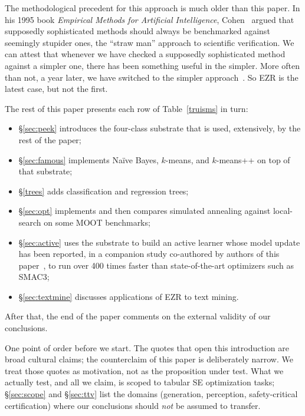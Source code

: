 \documentclass[AMA,STIX2COL]{WileyNJDv5}
\newcommand{\NEW}[1]{\textcolor{newblue}{#1}}
\begin{document}
The methodological precedent for this approach is much older than this paper.
In his 1995 book {\em
Empirical Methods for Artificial Intelligence},
Cohen~\cite{cohen1995empirical} argued that supposedly
sophisticated methods should always be benchmarked against
seemingly stupider ones, the ``straw man'' approach to
scientific verification. We can attest that whenever we have
checked a supposedly sophisticated method against a simpler one,
there has been something useful in the simpler. More often than
not, a year later, we have switched to the simpler
approach~\cite{Nair17a,agrawal2019dodge,tantithamthavorn2016automated,
fu2016tuning}. So EZR is the latest case, but not the first.

The rest of this paper presents each row of
Table~\ref{truisms} in turn:
\begin{itemize}
\item
\S\ref{sec:peek} introduces the four-class substrate that is used, extensively, by the rest of the paper;
\item
\S\ref{sec:famous} implements Naïve Bayes, $k$-means, and
$k$-means++ on top of that substrate;
\item
\S\ref{trees} adds classification and regression trees;
\item 
\S\ref{sec:opt} implements and then compares simulated annealing against
local-search   on some MOOT benchmarks;
\item
\S\ref{sec:active} uses the substrate to build an active learner
whose model update has been reported, in a companion study
co-authored by \NEW{authors of this paper}~\cite{ganguly2026lowgodatalightse},
to run \NEW{over 400 times} faster than state-of-the-art optimizers such as
SMAC3;
\item
 \S\ref{sec:textmine} discusses applications of EZR to text mining.
 \end{itemize}
 After that, the end of the paper comments on the external validity of
 our conclusions.

One point of order before we start. The quotes \NEW{that open this
introduction} are broad cultural claims; the counterclaim of this
paper is deliberately narrow. We treat those quotes as
motivation, not as the proposition under test. What we actually
test, and all we claim, is scoped to tabular SE optimization
tasks; \S\ref{sec:scope} and \S\ref{sec:ttv} list the domains
(generation, perception, safety-critical certification) where
our conclusions should {\em not} be assumed to transfer.
\end{document}
